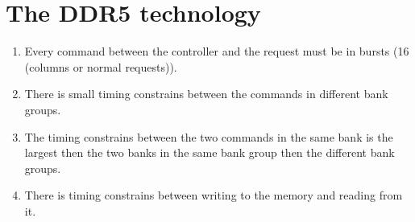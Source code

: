 \section{The DDR5 technology}
\begin{enumerate}
    \item Every command between the controller and the request must be in bursts (16 (columns or normal requests)).
    \item There is small timing constrains between the commands in different bank groups.
    \item The timing constrains between the two commands in the same bank is the largest then the two banks in the same bank group then the different bank groups.
    \item There is timing constrains between writing to the memory and reading from it.
\end{enumerate}